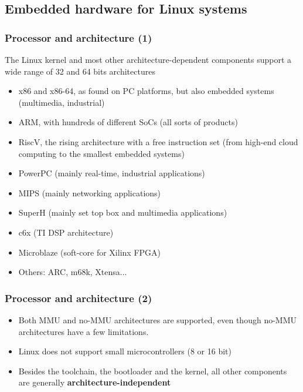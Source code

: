 \subsection{Embedded hardware for Linux systems}

\begin{frame}
  \frametitle{Processor and architecture (1)}
  The Linux kernel and most other architecture-dependent
  components support a wide range of 32 and 64 bits architectures
  \begin{itemize}
  \item x86 and x86-64, as found on PC platforms, but also embedded systems
    (multimedia, industrial)
  \item ARM, with hundreds of different SoCs (all sorts of products)
  \item RiscV, the rising architecture with a free instruction set
        (from high-end cloud computing to the smallest embedded systems)
  \item PowerPC (mainly real-time, industrial applications)
  \item MIPS (mainly networking applications)
  \item SuperH (mainly set top box and multimedia applications)
  \item c6x (TI DSP architecture)
  \item Microblaze (soft-core for Xilinx FPGA)
  \item Others: ARC, m68k, Xtensa...
  \end{itemize}
\end{frame}

\begin{frame}
  \frametitle{Processor and architecture (2)}
  \begin{itemize}
  \item Both MMU and no-MMU architectures are supported, even though
    no-MMU architectures have a few limitations.
  \item Linux does not support small microcontrollers (8 or 16 bit)
  \item Besides the toolchain, the bootloader and the kernel, all
    other components are generally {\bf architecture-independent}
  \end{itemize}
\end{frame}

